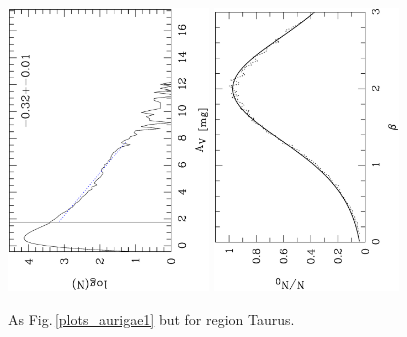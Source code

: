 \documentclass[useAMS,usenatbib]{mn2e}
\begin{document}
\begin{appendix}
\begin{figure}
\includegraphics[height=7.5cm,angle=-90]{av_dist_taurus.ps}
\hfill
\includegraphics[height=7.5cm,angle=-90]{histo_taurus.ps}
\caption{\label{plots_taurus} As Fig.\,\ref{plots_aurigae1} but for region
Taurus.} 
\end{figure}


\end{appendix}
\end{document}
